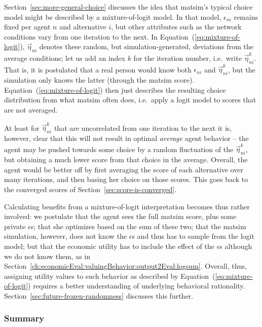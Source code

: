 Section~\ref{sec:more-general-choice} discusses the idea that \gls{matsim}'s typical choice model might be described by a mixture-of-logit model.  In that model,  $\epsilon_{ni}$ remains fixed per agent $n$ and alternative $i$, but other attributes such as the network conditions vary from one iteration to the next.  
%
In Equation~(\ref{eq:mixture-of-logit}), $\vec\eta_{ni}$ denotes these random, but simulation-generated, deviations from the average conditions; let us add an index $k$ for the iteration number, i.e.\ write $\vec\eta_{ni}^k$.  That is, it is postulated that a real person would know both $\epsilon_{ni}$ and $\vec\eta_{ni}^k$, but the simulation only knows the latter (through the \gls{matsim} score).  
%
Equation~(\ref{eq:mixture-of-logit}) then just describes the resulting choice distribution from what \gls{matsim} often does, i.e.\ apply a logit model to scores that are not averaged.

At least for $\vec\eta^k_{ni}$ that are uncorrelated from one iteration to the next it is, however, clear that this will not result in optimal \emph{average} agent behavior -- the agent may be pushed towards some choice by a random fluctuation of the $\vec\eta_{ni}^k$, but obtaining a much lower score from that choice in the average.  Overall, the agent would be better off by first averaging the score of each alternative over many iterations, and then basing her choice on those scores.  This goes back to the converged scores of Section~\ref{sec:score-is-converged}.

Calculating benefits from a mixture-of-logit interpretation becomes thus rather involved: we postulate that the agent sees the full \gls{matsim} score, plus some private $\epsilon$s; that she optimizes based on the sum of these two; that the \gls{matsim} simulation, however, does not know the $\epsilon$s and thus has to sample from the logit model; but that the economic utility has to include the effect of the $\epsilon$s although we do not know them, as in Section~\ref{ch:economicEval:valuingBehavior:output2Eval:logsum}.  Overall, thus, assigning utility values to such behavior as described by Equation~(\ref{eq:mixture-of-logit}) requires a better understanding of  underlying behavioral rationality.  Section~\ref{sec:future-frozen-randomness} discusses this  further.



\subsubsection{Summary}
\label{ch:economicEval:valuingBehavior:output2Eval:summary}

